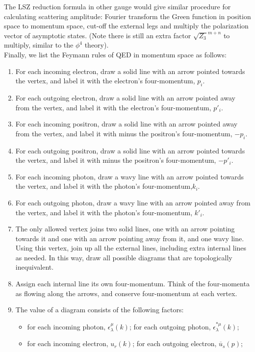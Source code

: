 \documentclass[cyan]{elegantnote}
\begin{document}
\noindent
The LSZ reduction formula in other gauge would give similar procedure for calculating scattering amplitude: Fourier transform the Green function in position space to momentum space, cut-off the external legs and multiply the polarization vector of asymptotic states. (Note there is still an extra factor $\sqrt{Z_3}^{m+n}$ to multiply, similar to the $\phi^4$ theory).\\
Finally, we list the Feymann rules of QED in momentum space as follows:
\begin{enumerate}
\item For each incoming electron, draw a solid line with an arrow pointed towards the vertex, and label it with the electron's four-momentum, $p_i$.
\item For each outgoing electron, draw a solid line with an arrow pointed away from the vertex, and label it with the electron's four-momentum, $p'_i$.
\item For each incoming positron, draw a solid line with an arrow pointed away from the vertex, and label it with minus the positron's four-momentum, $-p_i$.
\item For each outgoing positron, draw a solid line with an arrow pointed towards the vertex, and label it with minus the positron's four-momentum, $-p'_i$.
\item For each incoming photon, draw a wavy line with an arrow pointed towards the vertex, and label it with the photon's four-momentum,$k_i$.
\item For each outgoing photon, draw a wavy line with an arrow pointed away from the vertex, and label it with the photon's four-momentum, $k'_i$.
\item The only allowed vertex joins two solid lines, one with an arrow pointing towards it and one with an arrow pointing away from it, and one wavy line. Using this vertex, join up all the external lines, including extra internal lines as needed. In this way, draw all possible diagrams that are topologically inequivalent.
\item Assign each internal line its own four-momentum. Think of the four-momenta as flowing along the arrows, and conserve four-momentum at each vertex. 
\item The value of a diagram consists of the following factors:
\begin{itemize}
\item for each incoming photon, $\epsilon^{\mu}_{\lambda}(k)$; 
for each outgoing photon, $\epsilon^{*\mu}_{\lambda}(k)$;
\item for each incoming electron, $u_{r}(k)$; for each outgoing electron, $\overline{u}_{s}(p)$;

\end{itemize}
\end{enumerate}
\end{document}
